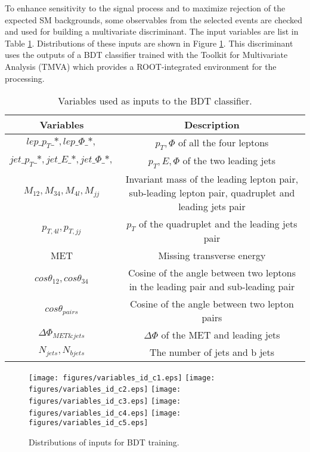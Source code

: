 To enhance sensitivity to the signal process and to maximize rejection of the expected SM backgrounds, some observables from the selected events are checked and used for building a multivariate discriminant. The input variables are list in Table \ref{Tab.bdt inputs}. Distributions of these inputs are shown in Figure \ref{Fig.inputs}. This discriminant uses the outputs of a BDT classifier trained with the Toolkit for Multivariate Analysis (TMVA) which provides a ROOT-integrated environment for the processing.

\begin{table}[H]
\begin{center}
\caption{Variables used as inputs to the BDT classifier.}
\label{Tab.bdt inputs}
\begin{tabular}{cc}
	\toprule
	\toprule	
	Variables&Description\\
	\midrule
	$lep\_p_{T}\_*,lep\_\Phi\_*,$&$p_{T},\Phi$ of all the four leptons\\
	\midrule
	$jet\_p_{T}\_*,jet\_E\_*,jet\_\Phi\_*,$&$p_{T},E,\Phi$ of the two leading jets\\
	\midrule
	$M_{12},M_{34},M_{4l},M_{jj}$&\makecell[c]{Invariant mass of the leading lepton pair, \\sub-leading lepton pair, quadruplet and leading jets pair}\\
	\midrule
	$p_{T,4l},p_{T,jj}$&$p_{T}$ of the quadruplet and the leading jets pair\\
	\midrule
	MET&Missing transverse energy\\
	\midrule
	$cos\theta_{12},cos\theta_{34}$&\makecell[c]{Cosine of the angle between two leptons \\in the leading pair and sub-leading pair}\\
	\midrule
	$cos\theta_{pairs}$&Cosine of the angle between two lepton pairs\\
	\midrule
	$\Delta\Phi_{MET\&jets}$&$\Delta\Phi$ of the MET and leading jets\\
	\midrule
	$N_{jets},N_{bjets}$&The number of jets and b jets\\
	\bottomrule
	\bottomrule
\end{tabular}
\end{center}
\end{table}

\begin{figure}[H]
	\caption{Distributions of inputs for BDT training.}
	\label{Fig.inputs}
	\centering
	\texttt{[image: figures/variables\_id\_c1.eps]}
	\texttt{[image: figures/variables\_id\_c2.eps]}
	\texttt{[image: figures/variables\_id\_c3.eps]}
	\texttt{[image: figures/variables\_id\_c4.eps]}
	\texttt{[image: figures/variables\_id\_c5.eps]}
\end{figure}

